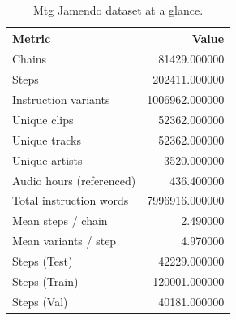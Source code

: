 \begin{table}
\caption{Mtg Jamendo dataset at a glance.}
\label{tab:mtg_jamendo_overview}
\begin{tabular}{lr}
\toprule
Metric & Value \\
\midrule
Chains & 81429.000000 \\
Steps & 202411.000000 \\
Instruction variants & 1006962.000000 \\
Unique clips & 52362.000000 \\
Unique tracks & 52362.000000 \\
Unique artists & 3520.000000 \\
Audio hours (referenced) & 436.400000 \\
Total instruction words & 7996916.000000 \\
Mean steps / chain & 2.490000 \\
Mean variants / step & 4.970000 \\
Steps (Test) & 42229.000000 \\
Steps (Train) & 120001.000000 \\
Steps (Val) & 40181.000000 \\
\bottomrule
\end{tabular}
\end{table}
